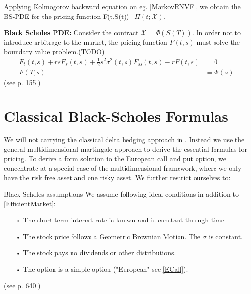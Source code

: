 Applying Kolmogorov backward equation on eg. \ref{MarkovRNVF}, we obtain the BS-PDE for the pricing function F(t,S(t))=$\Pi(t; \mathcal{X})$.

\begin{theorem}\label{BSPDEMultiDim}
\textbf{Black Scholes PDE: } Consider the contract $\mathcal{X}=\Phi(S(T))$. In order not to introduce arbitrage to the market, the pricing function $F(t,s)$ must solve the boundary value problem.(TODO)
\begin{equation}
\begin{split}
F_t(t,s)+rsF_s(t,s)+\frac{1}{2} s^2 \sigma^2(t,s)F_{ss}(t,s) -rF(t,s)&=0\\
F(T,s)&=\Phi(s)
\end{split}
\end{equation}
(see p. 155 \parencite{finKont})
\end{theorem}


\section{Classical Black-Scholes Formulas}\label{classicBS}
We will not carrying the classical delta hedging approach in \parencite{B-S-Paper}. Instead we use the general multidimensional martingale approach to derive the essential formulas for pricing. 
To derive a form solution to the European call and put option, we concentrate at a special case of the multidimensional framework, where we only have the risk free asset and one risky asset. 
We further restrict ourselves to:\\
\theoremstyle{assumption}
\begin{assumption}{Black-Scholes assumptions}\label{BS-Assumption}
We assume following ideal conditions in addition to \eqref{EfficientMarket}:
\begin{enumerate}
\item[•] The short-term interest rate is known and is constant through time 
\item[•] The stock price follows a Geometric Brownian Motion. The $\sigma$ is constant.\item[•] The stock pays no dividends or other distributions.
\item[•] The option is a simple option ("European" see \eqref{ECall}).
\end{enumerate}
(see p. 640 \parencite{B-S-Paper})
\end{assumption}

